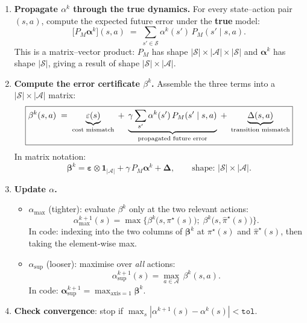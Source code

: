 \documentclass[11pt]{article}
\newcommand{\pistar}{\pi^\star}
\newcommand{\pihatstar}{\hat\pi^\star}
\begin{document}
\begin{enumerate}
\item \textbf{Propagate $\alpha^k$ through the true dynamics.}
For every state--action pair $(s, a)$, compute the expected future error
under the \textbf{true} model:
\begin{equation}\label{eq:propagate-q}
  \bigl[P_M \boldsymbol{\alpha}^k\bigr](s, a)
  \;=\; \sum_{s' \in \mathcal{S}} \alpha^k(s')\, P_M(s' \mid s, a).
\end{equation}
This is a matrix--vector product: $P_M$ has shape $|\mathcal{S}| \times
|\mathcal{A}| \times |\mathcal{S}|$ and $\boldsymbol{\alpha}^k$ has shape
$|\mathcal{S}|$, giving a result of shape $|\mathcal{S}| \times |\mathcal{A}|$.

\item \textbf{Compute the error certificate $\beta^k$.}
Assemble the three terms into a $|\mathcal{S}| \times |\mathcal{A}|$ matrix:
\begin{equation}\label{eq:beta-q}
  \boxed{%
    \beta^k(s, a)
    \;=\; \underbrace{\varepsilon(s)}_{\text{cost mismatch}}
    \;+\; \underbrace{\gamma \sum_{s'} \alpha^k(s')\, P_M(s' \mid s, a)}_{\text{propagated future error}}
    \;+\; \underbrace{\Delta(s, a)}_{\text{transition mismatch}}
  }
\end{equation}
In matrix notation:
\[
  \boldsymbol{\beta}^k
  = \boldsymbol{\varepsilon} \otimes \mathbf{1}_{|\mathcal{A}|}
  + \gamma\, P_M \boldsymbol{\alpha}^k
  + \boldsymbol{\Delta},
  \qquad \text{shape: } |\mathcal{S}| \times |\mathcal{A}|.
\]

\item \textbf{Update $\alpha$.}
\begin{itemize}
  \item $\alpha_{\max}$ (tighter): evaluate $\beta^k$ only at the two relevant
        actions:
  \begin{equation}\label{eq:alpha-max-q}
    \alpha^{k+1}_{\max}(s) = \max\!\Big\{
      \beta^k\bigl(s , \pistar(s)\bigr) ;\;
      \beta^k\bigl(s , \pihatstar(s)\bigr)
    \Big\}.
  \end{equation}
  In code: indexing into the two columns of $\boldsymbol{\beta}^k$ at
  $\pistar(s)$ and $\pihatstar(s)$, then taking the element-wise max.

  \item $\alpha_{\sup}$ (looser): maximise over \emph{all} actions:
  \begin{equation}\label{eq:alpha-sup-q}
    \alpha^{k+1}_{\sup}(s) = \max_{a \in \mathcal{A}}\, \beta^k(s, a).
  \end{equation}
  In code: $\boldsymbol{\alpha}^{k+1}_{\sup} = \max_{\text{axis}=1}
  \boldsymbol{\beta}^k$.
\end{itemize}

\item \textbf{Check convergence}: stop if
$\max_s |\alpha^{k+1}(s) - \alpha^k(s)| < \texttt{tol}$.
\end{enumerate}
\end{document}
